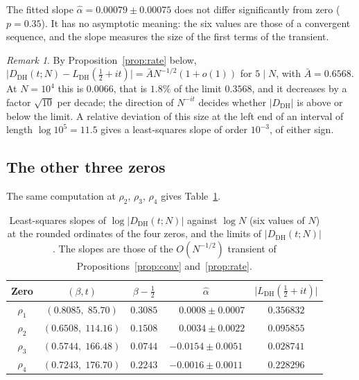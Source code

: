 \documentclass[11pt]{amsart}
\theoremstyle{definition}
\theoremstyle{remark}
\newtheorem{remark}[theorem]{Remark}
\renewcommand{\DH}{\mathrm{DH}}
\newcommand{\abs}[1]{\lvert #1 \rvert}
\newcommand{\Abar}{\bar A}
\begin{document}
The fitted slope $\hat\alpha = 0.00079 \pm 0.00075$ does not differ
significantly from zero ($p = 0.35$).  It has no asymptotic meaning: the
six values are those of a convergent sequence, and the slope measures the
size of the first terms of the transient.

\begin{remark}\label{rem:transient}
By Proposition~\ref{prop:rate} below,
$\abs{D_{\DH}(t;N)-L_{\DH}(\tfrac12+it)}=\Abar N^{-1/2}(1+o(1))$ for
$5\mid N$, with $\Abar=0.6568$.  At $N=10^4$ this is $0.0066$, that is
$1.8\%$ of the limit $0.3568$, and it decreases by a factor $\sqrt{10}$
per decade; the direction of $N^{-it}$ decides whether $\abs{D_{\DH}}$ is
above or below the limit.  A relative deviation of this size at the left
end of an interval of length $\log 10^5=11.5$ gives a least-squares slope
of order $10^{-3}$, of either sign.
\end{remark}

\subsection{The other three zeros}\label{ssec:additional-zeros}

The same computation at $\rho_2$, $\rho_3$, $\rho_4$ gives
Table~\ref{tab:all-zeros}.

\begin{table}[ht]
\centering
\caption{Least-squares slopes of $\log\abs{D_{\DH}(t;N)}$ against
  $\log N$ (six values of $N$) at the rounded ordinates of the four
  zeros, and the limits of $\abs{D_{\DH}(t;N)}$.  The slopes are those of
  the $O(N^{-1/2})$ transient of Propositions~\ref{prop:conv}
  and~\ref{prop:rate}.}
\label{tab:all-zeros}
\begin{tabular}{@{}ccccc@{}}
\toprule
Zero & $(\beta, t)$ & $\beta-\tfrac12$ &
  $\hat\alpha$ & $\abs{L_{\DH}(\tfrac12+it)}$ \\
\midrule
$\rho_1$ & $(0.8085,\; 85.70)$  & $0.3085$ & $\phantom{-}0.0008\pm0.0007$ &
  $0.356832$ \\
$\rho_2$ & $(0.6508,\; 114.16)$ & $0.1508$ & $\phantom{-}0.0034\pm0.0022$ &
  $0.095855$ \\
$\rho_3$ & $(0.5744,\; 166.48)$ & $0.0744$ & $-0.0154\pm0.0051$ &
  $0.028741$ \\
$\rho_4$ & $(0.7243,\; 176.70)$ & $0.2243$ & $-0.0016\pm0.0011$ &
  $0.228296$ \\
\bottomrule
\end{tabular}
\end{table}
\end{document}
